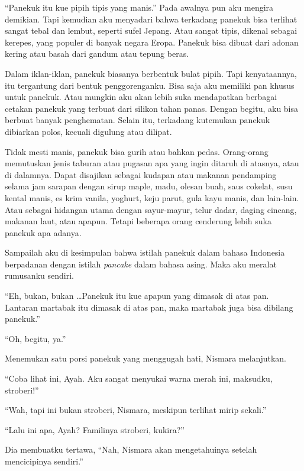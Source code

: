 \documentclass[smalldemyvopaper,11pt,twoside,onecolumn,openright,extrafontsizes]{memoir}
\begin{document}

``Panekuk itu kue pipih tipis yang manis.'' Pada awalnya pun aku mengira demikian. Tapi kemudian aku menyadari bahwa terkadang panekuk bisa terlihat sangat tebal dan lembut, seperti sufel Jepang. Atau sangat tipis, dikenal sebagai kerepes, yang populer di banyak negara Eropa. Panekuk bisa dibuat dari adonan kering atau basah dari gandum atau tepung beras.


Dalam iklan-iklan, panekuk biasanya berbentuk bulat pipih. Tapi kenyataannya, itu tergantung dari bentuk penggorenganku. Bisa saja aku memiliki pan khusus untuk panekuk. Atau mungkin aku akan lebih suka mendapatkan berbagai cetakan panekuk yang terbuat dari silikon tahan panas. Dengan begitu, aku bisa berbuat banyak penghematan. Selain itu, terkadang kutemukan panekuk dibiarkan polos, kecuali digulung atau dilipat.


Tidak mesti manis, panekuk bisa gurih atau bahkan pedas. Orang-orang memutuskan jenis taburan atau pugasan apa yang ingin ditaruh di atasnya, atau di dalamnya. Dapat disajikan sebagai kudapan atau makanan pendamping selama jam sarapan dengan sirup maple, madu, olesan buah, saus cokelat, susu kental manis, es krim vanila, yoghurt, keju parut, gula kayu manis, dan lain-lain. Atau sebagai hidangan utama dengan sayur-mayur, telur dadar, daging cincang, makanan laut, atau apapun. Tetapi beberapa orang cenderung lebih suka panekuk apa adanya.

Sampailah aku di kesimpulan bahwa istilah panekuk dalam bahasa Indonesia berpadanan dengan istilah \textit{pancake} dalam bahasa asing. Maka aku meralat rumusanku sendiri.

``Eh, bukan, bukan \dots Panekuk itu kue apapun yang dimasak di atas pan. Lantaran martabak itu dimasak di atas pan, maka martabak juga bisa dibilang panekuk.''

``Oh, begitu, ya.''

Menemukan satu porsi panekuk yang menggugah hati, Nismara melanjutkan.

``Coba lihat ini, Ayah. Aku sangat menyukai warna merah ini, maksudku, stroberi!''

``Wah, tapi ini bukan stroberi, Nismara, meskipun terlihat mirip sekali.''

``Lalu ini apa, Ayah? Familinya stroberi, kukira?''

Dia membuatku tertawa, ``Nah, Nismara akan mengetahuinya setelah mencicipinya sendiri.''
\end{document}
